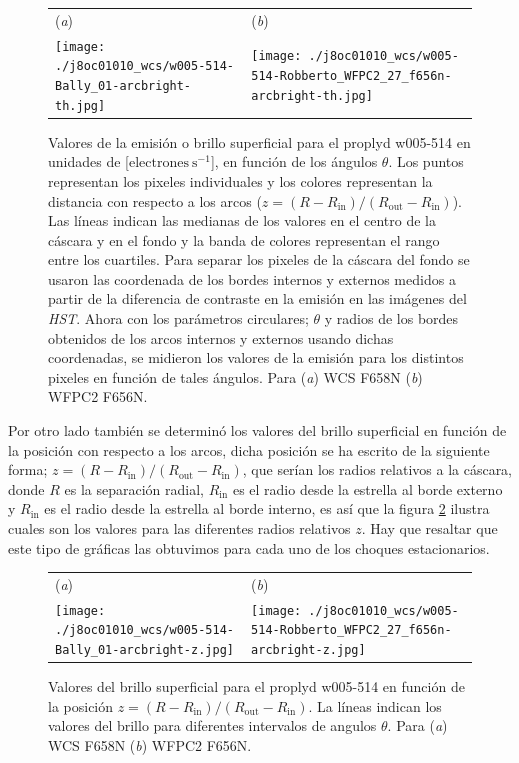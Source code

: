 \begin{figure}[htp]
\centering
\begin{tabular}{l l}
(\textit{a}) & (\textit{b})  \\
  \texttt{[image: ./j8oc01010\_wcs/w005-514-Bally\_01-arcbright-th.jpg]}
& \texttt{[image: ./j8oc01010\_wcs/w005-514-Robberto\_WFPC2\_27\_f656n-arcbright-th.jpg]}\\
\end{tabular}
\caption{Valores de la emisión o brillo superficial para el proplyd w005-514 en unidades de [\(\text{electrones}~\text{s}^{-1}\)], en función de los ángulos \(\theta\). Los puntos representan los pixeles individuales y los colores representan la distancia con respecto a los arcos (\(z = (R - R_{\text{in}})/(R_{\text{out}} - R_{\text{in}})\)). Las líneas indican las medianas de los valores en el centro de la cáscara y en el fondo y la banda de colores representan el rango entre los cuartiles. Para separar los pixeles de la cáscara del fondo se usaron las coordenada de los bordes internos y externos medidos a partir de la diferencia de contraste en la emisión en las imágenes del \textit{HST}. Ahora con los parámetros circulares; \(\theta\) y radios de los bordes obtenidos de los arcos internos y externos usando dichas coordenadas, se midieron los valores de la emisión para los distintos pixeles en función de tales ángulos. Para (\textit{a}) WCS F658N (\textit{b}) WFPC2 F656N.}\label{fig:brillo-theta}
\end{figure}


Por otro lado también se determinó los valores del brillo superficial en función de la posición con respecto a los arcos, dicha posición se ha escrito de la siguiente forma; \(z = (R - R_{\text{in}})/(R_{\text{out}} - R_{\text{in}})\), que serían los radios relativos a la cáscara, donde \(R\) es la separación radial, \(R_{\text{in}}\) es el radio  desde la estrella al borde externo y \(R_{\text{in}}\) es el radio desde  la estrella al borde interno, es así que la figura \ref{fig:brillo-z} ilustra cuales son los valores para las diferentes radios relativos \(z\). Hay que resaltar que este tipo de gráficas las obtuvimos para cada uno de los choques estacionarios.\\
\begin{figure}[htp]
\centering
\begin{tabular}{l l}
(\textit{a}) & (\textit{b})  \\
  \texttt{[image: ./j8oc01010\_wcs/w005-514-Bally\_01-arcbright-z.jpg]}
& \texttt{[image: ./j8oc01010\_wcs/w005-514-Robberto\_WFPC2\_27\_f656n-arcbright-z.jpg]}\\
\end{tabular}
\caption{Valores del brillo superficial para el proplyd w005-514 en función de la posición  \(z = (R - R_{\text{in}})/(R_{\text{out}} - R_{\text{in}})\). La líneas indican los valores del brillo para diferentes intervalos de angulos \(\theta\).  Para (\textit{a}) WCS F658N (\textit{b}) WFPC2 F656N.}\label{fig:brillo-z}
\end{figure}

